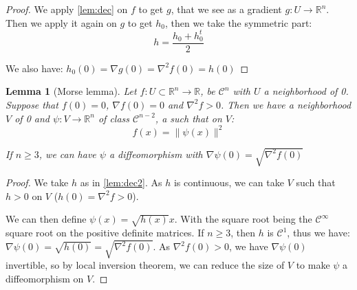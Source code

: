 \documentclass[10pt,a4paper]{report}
\theoremstyle{plain}
\newtheorem{lem}[thm]{Lemma}
\theoremstyle{definition}
\theoremstyle{remark}
\newcommand{\R}{\ensuremath{\mathbb{R}}}
\renewcommand{\geq}{\geqslant}
\newcommand{\class}[1]{{\mathscr{C}^{#1}}}
\begin{document}
\begin{proof}
  We apply \cref{lem:dec} on $f$ to get $g$, that we see as a gradient $g :U \to
  \R^n$. Then we apply it again on $g$ to get $h_0$, then we take the symmetric part:
  \[h = \frac{h_0 + h_0^t}2\]

  We also have: $h_0(0) = \nabla g(0) = \nabla^2 f(0) = h(0)$
\end{proof}


\begin{lem}[Morse lemma]\label{lem:morse}
  Let $f : U \subset \R^n \to \R$, be $\class{n}$ with $U $ a neighborhood of 0.
  Suppose that $f(0) = 0$, $\nabla f(0) = 0$ and $\nabla^2 f > 0$.
  Then we have a neighborhood $V$ of 0 and $\psi : V \to \R^n$ of class
  $\class{n-2}$, a such that on $V$:
  \[f(x) = \|\psi(x)\|^2\]

  If $n \geq 3$, we can have $\psi$ a diffeomorphism with $\nabla \psi(0) = \sqrt{\nabla^2 f(0)}$
\end{lem}

\begin{proof}
  We take $h$ as in \cref{lem:dec2}. As $h$ is continuous, we can take $V$ such
  that $h > 0$ on $V$ ($h(0) = \nabla^2 f > 0$).

  We can then define $\psi(x) = \sqrt{h(x)} x$. With the square root being the
  $\class{\infty}$ square root on the positive definite matrices.
  If $n \geq 3$, then $h$ is $\class 1$, thus we have: $\nabla \psi(0) =
  \sqrt{h(0)} = \sqrt{\nabla^2 f(0)}$. As $\nabla^2
  f(0) > 0$, we have $\nabla \psi(0)$ invertible, so by local inversion theorem,
  we can reduce the size of $V$ to make $\psi$ a diffeomorphism on $V$.

\end{proof}




\end{document}
